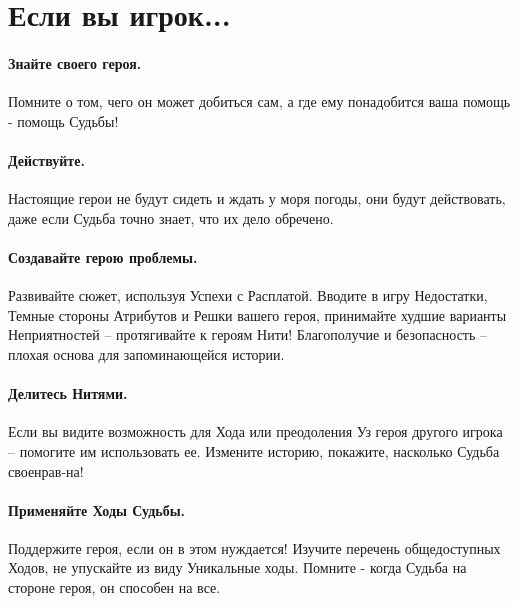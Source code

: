 \section*{Если вы игрок...}

\paragraph{Знайте своего героя.} Помните о том, чего он может добиться сам, а где ему понадобится ваша помощь - помощь Судьбы!
\paragraph{Действуйте.} Настоящие герои не будут сидеть и ждать у моря погоды, они будут действовать, даже если Судьба точно знает, что их дело обречено.
\paragraph{Создавайте герою проблемы.} Развивайте сюжет, используя Успехи с Расплатой. Вводите в игру Недостатки, Темные стороны Атрибутов и Решки вашего героя, принимайте худшие варианты Неприятностей – протягивайте к героям Нити! Благополучие и безопасность – плохая основа для запоминающейся истории.
\paragraph{Делитесь Нитями.} Если вы видите возможность для Хода или преодоления Уз героя другого игрока – помогите им использовать ее. Измените историю, покажите, насколько Судьба своенрав-на!
\paragraph{Применяйте Ходы Судьбы.} Поддержите героя, если он в этом нуждается! Изучите перечень общедоступных Ходов, не упускайте из виду Уникальные ходы. Помните - когда Судьба на стороне героя, он способен на все.